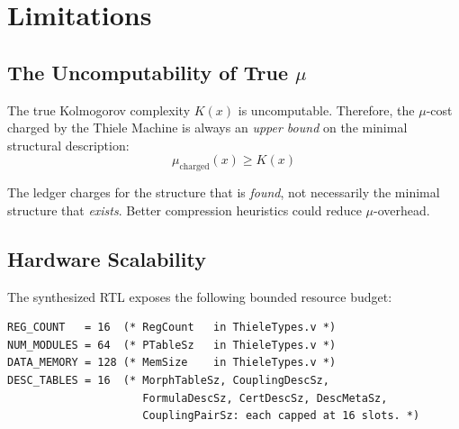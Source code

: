 \section{Limitations}

\subsection{The Uncomputability of True $\mu$}

The true Kolmogorov complexity $K(x)$ is uncomputable. Therefore, the $\mu$-cost charged by the Thiele Machine is always an \textit{upper bound} on the minimal structural description:
\begin{equation}
    \mu_{\text{charged}}(x) \ge K(x)
\end{equation}

The ledger charges for the structure that is \textit{found}, not necessarily the minimal structure that \textit{exists}. Better compression heuristics could reduce $\mu$-overhead.

\subsection{Hardware Scalability}

The synthesized RTL exposes the following bounded resource budget:
\begin{lstlisting}
REG_COUNT   = 16  (* RegCount   in ThieleTypes.v *)
NUM_MODULES = 64  (* PTableSz   in ThieleTypes.v *)
DATA_MEMORY = 128 (* MemSize    in ThieleTypes.v *)
DESC_TABLES = 16  (* MorphTableSz, CouplingDescSz,
                     FormulaDescSz, CertDescSz, DescMetaSz,
                     CouplingPairSz: each capped at 16 slots. *)
\end{lstlisting}

